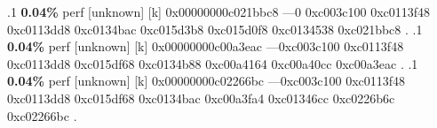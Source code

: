 \begin{profile}
{.1 \textbf{ 0.04\%} perf             [unknown]              [k] 0x00000000c021bbc8\newline {} ---0\newline {} 0xc003c100\newline {} 0xc0113f48\newline {} 0xc0113dd8\newline {} 0xc0134bac\newline {} 0xc015d3b8\newline {} 0xc015d0f8\newline {} 0xc0134538\newline {} 0xc021bbc8\newline {} . 
.1 \textbf{ 0.04\%} perf             [unknown]              [k] 0x00000000c00a3eac\newline {} ---0xc003c100\newline {} 0xc0113f48\newline {} 0xc0113dd8\newline {} 0xc015df68\newline {} 0xc0134b88\newline {} 0xc00a4164\newline {} 0xc00a40cc\newline {} 0xc00a3eac\newline {} . 
.1 \textbf{ 0.04\%} perf             [unknown]              [k] 0x00000000c02266bc\newline {} ---0xc003c100\newline {} 0xc0113f48\newline {} 0xc0113dd8\newline {} 0xc015df68\newline {} 0xc0134bac\newline {} 0xc00a3fa4\newline {} 0xc01346cc\newline {} 0xc0226b6c\newline {} 0xc02266bc\newline {} . 
}
\end{profile}
